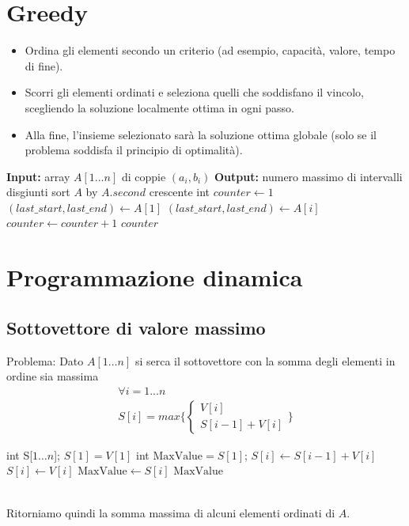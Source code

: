\documentclass[10pt]{extarticle}
\begin{document}
\section{Greedy}
\begin{itemize}
  \item Ordina gli elementi secondo un criterio (ad esempio, capacità, valore, tempo di fine).
  \item Scorri gli elementi ordinati e seleziona quelli che soddisfano il vincolo, scegliendo la soluzione localmente ottima in ogni passo.
  \item Alla fine, l’insieme selezionato sarà la soluzione ottima globale (solo se il problema soddisfa il principio di optimalità).
\end{itemize}
\begin{algorithm}
\caption{countDisjointIntervals(array $A[1 \dots n]$)}
\begin{algorithmic}[1]
\State \textbf{Input:} array $A[1 \dots n]$ di coppie $(a_i, b_i)$
\State \textbf{Output:} numero massimo di intervalli disgiunti
\State sort $A$ by $A.second$ crescente
\State int $counter \gets 1$
\State $(last\_start, last\_end) \gets A[1]$
    \State $(last\_start, last\_end) \gets A[i]$
    \State $counter \gets counter + 1$
  \EndIf
\EndFor
\State \Return $counter$
\end{algorithmic}
\end{algorithm}
\section{Programmazione dinamica}
\subsection{Sottovettore di valore massimo}
Problema: Dato $A[1...n]$ si serca il sottovettore con la somma degli elementi in ordine sia massima
\begin{align*}
  \forall i =1...n\\
  S[i]=max\{\begin{cases}
    V[i] \\
    S[i-1]+V[i]
  \end{cases}\}
\end{align*}
\begin{algorithm}
\caption{sottovettoreMax(int $V[1...n]$)}
\begin{algorithmic}[1]
\State int S[$1 \dots n$];
\State $S[1]=V[1]$
\State int $\text{MaxValue}=S[1]$;
    \State $S[i] \gets S[i-1] + V[i]$
  \Else
    \State $S[i] \gets V[i]$
  \EndIf
    \State $\text{MaxValue} \gets S[i]$
  \EndIf
\EndFor
\State \Return $\text{MaxValue}$
\end{algorithmic}
\end{algorithm} \\
Ritorniamo quindi la somma massima di alcuni elementi ordinati di $A$.
\vspace{1em}
\end{document}
